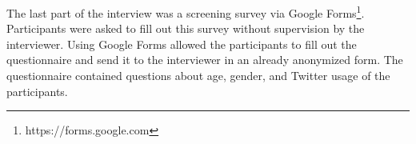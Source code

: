 The last part of the interview was a screening survey via Google Forms\footnote{https://forms.google.com}. Participants were asked to fill out this survey without supervision by the interviewer. Using Google Forms allowed the participants to fill out the questionnaire and send it to the interviewer in an already anonymized form. The questionnaire contained questions about age, gender, and Twitter usage of the participants.
